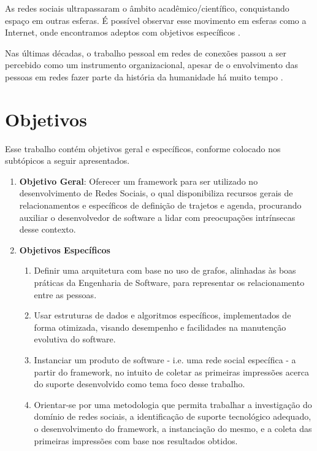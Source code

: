 As redes sociais ultrapassaram o âmbito acadêmico/científico, conquistando espaço em outras esferas. É possível observar esse movimento em esferas como a Internet, onde encontramos adeptos com objetivos específicos \cite{Tomae:Alcara:Chiara:2005}.

Nas últimas décadas, o trabalho pessoal em redes de conexões passou a ser percebido como um instrumento organizacional, apesar de o envolvimento das pessoas em redes fazer parte da história da humanidade há muito tempo \cite{Tomae:Alcara:Chiara:2005}.


\section*{Objetivos}
\label{sec:objetivos}

Esse trabalho contém objetivos geral e específicos, conforme colocado nos subtópicos a seguir apresentados.

\begin{enumerate}
	\item \textbf{Objetivo Geral}: Oferecer um framework para ser utilizado no desenvolvimento de Redes Sociais, o qual disponibiliza recursos gerais de relacionamentos e específicos de definição de trajetos e agenda, procurando auxiliar o desenvolvedor de software a lidar com preocupações intrínsecas desse contexto.

	\item \textbf{Objetivos Específicos}
	\begin{enumerate}
		\item Definir uma arquitetura com base no uso de grafos, alinhadas às boas práticas da Engenharia de Software, para representar os relacionamento entre as pessoas.
		\item Usar estruturas de dados e algoritmos específicos, implementados de forma otimizada, visando desempenho e facilidades na manutenção evolutiva do software.
		\item Instanciar um produto de software - i.e. uma rede social específica - a partir do framework, no intuito de coletar as primeiras impressões acerca do suporte desenvolvido como tema foco desse trabalho.
		\item Orientar-se por uma metodologia que permita trabalhar a investigação do domínio de redes sociais, a identificação de suporte tecnológico adequado, o desenvolvimento do framework, a instanciação do mesmo, e a coleta das primeiras impressões com base nos resultados obtidos.
	\end{enumerate}
\end{enumerate}

